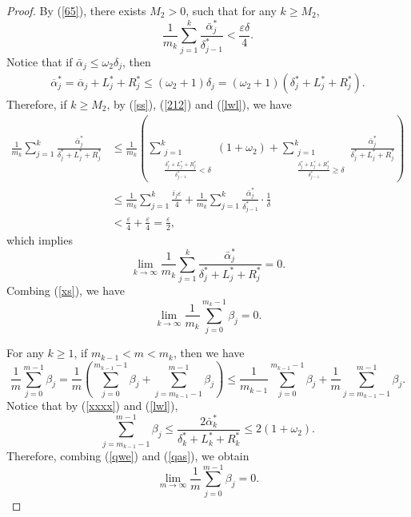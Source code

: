 \documentclass[10pt,a4paper]{amsart}
\begin{document}
\begin{proof}
By (\ref{65}), there exists $M_2>0$, such that for any $k\ge M_2$,
\begin{equation}\label{212}
\frac{1}{m_k} \sum_{j = 1}^{k}\frac{\bar{\alpha}^*_j}{\delta^*_{j-1}}<\frac{\varepsilon \delta}{4}.
\end{equation}
Notice that if $\bar{\alpha}_j\le \omega_2 \delta_j$, then
 \begin{align}\label{lwl}
\overline{\alpha } _{j}^{*}=\overline{\alpha}_j+L^*_j+R^*_j\le (\omega_2+1)\delta_j=(\omega_2+1)(\delta^*_{j}+L^*_j+R^*_j).
\end{align}
Therefore, if $k\ge M_2$, by (\ref{ss}),  (\ref{212}) and  (\ref{lwl}), we have
\begin{equation*}
\begin{aligned}
\frac{1}{m_k} \sum_{j = 1}^{k}\frac{\bar{\alpha}^*_j}{\delta^*_{j}+L^*_j+R^*_j}&\le \frac{1}{m_k}(\sum_{\substack{j=1\\\frac{\delta^*_j+L^*_j+R^*_j}{\delta^*_{j-1}}<\delta}}^{k}(1+\omega_2)+\sum_{\substack{j=1\\\frac{\delta^*_j+L^*_j+R^*_j}{\delta^*_{j-1}}\ge\delta}}^{k}\frac{\bar{\alpha}^*_j}{\delta^*_{j}+L^*_j+R^*_j} )\\
&\le \frac{1}{m_k}\sum_{j = 1}^{k}\frac{i_j\varepsilon }{4}+\frac{1}{m_k}\sum_{j = 1}^{k}\frac{\bar{\alpha}^*_j}{\delta^*_{j-1}}\cdot \frac{1}{\delta}\\
&<\frac{\varepsilon }{4}+\frac{\varepsilon }{4}=\frac{\varepsilon}{2},
\end{aligned}
\end{equation*}
which implies  $$\lim_{k \to \infty} \frac{1}{m_k} \sum_{j = 1}^{k}\frac{\bar{\alpha}^*_j}{\delta^*_{j}+L^*_j+R^*_j}=0.$$
Combing (\ref{xs}), we have
\begin{equation}\label{qwe}
\lim_{k \to \infty}\frac{1}{m_k} \sum_{j=0}^{m_k-1} \beta_{j}=0.
\end{equation}

For any  $k\ge 1$, if  $m_{k-1}<m<m_k$, then we have
\begin{equation}
\frac{1}{m} \sum_{j=0}^{m-1} \beta_{j}=\frac{1}{m} (\sum_{j=0}^{m_{k-1}-1} \beta_{j}+\sum_{j=m_{k-1}-1}^{m-1} \beta_{j})\le \frac{1}{m_{k-1}} \sum_{j=0}^{m_{k-1}-1} \beta_{j}+\frac{1}{m}\sum_{j=m_{k-1}-1}^{m-1}\beta_{j}.
\end{equation}
Notice that by (\ref{xxxx}) and (\ref{lwl}),
\begin{equation}\label{qas}
\sum_{j=m_{k-1}-1}^{m-1}\beta_{j}\le\frac{2\bar{\alpha}^*_k}{\delta^*_k+L^*_k+R^*_k}\le 2(1+\omega_2).
\end{equation}
Therefore, combing (\ref{qwe}) and (\ref{qas}), we obtain
\begin{equation*}
\lim_{m \to \infty} \frac{1}{m} \sum_{j=0}^{m-1} \beta_{j}=0.
\end{equation*}


\end{proof}
\end{document}
